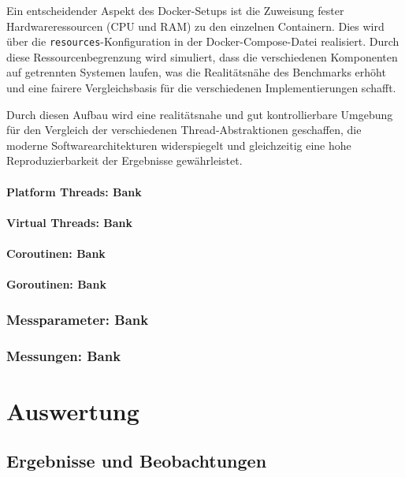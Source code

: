 \documentclass[fontsize=12pt,paper=a4,twoside=semi,parskip=half-,headsepline,headinclude]{scrreprt}
\begin{document}
Ein entscheidender Aspekt des Docker-Setups ist die Zuweisung fester Hardwareressourcen (CPU und RAM) zu den einzelnen Containern. Dies wird über die \texttt{resources}-Konfiguration in der Docker-Compose-Datei realisiert. Durch diese Ressourcenbegrenzung wird simuliert, dass die verschiedenen Komponenten auf getrennten Systemen laufen, was die Realitätsnähe des Benchmarks erhöht und eine fairere Vergleichsbasis für die verschiedenen Implementierungen schafft.

Durch diesen Aufbau wird eine realitätsnahe und gut kontrollierbare Umgebung für den Vergleich der verschiedenen Thread-Abstraktionen geschaffen, die moderne Softwarearchitekturen widerspiegelt und gleichzeitig eine hohe Reproduzierbarkeit der Ergebnisse gewährleistet.

\subsubsection{Platform Threads: Bank}

\subsubsection{Virtual Threads: Bank}

\subsubsection{Coroutinen: Bank}

\subsubsection{Goroutinen: Bank}

\subsection{Messparameter: Bank}

\subsection{Messungen: Bank}

\chapter{Auswertung}

\section{Ergebnisse und Beobachtungen}
\end{document}
